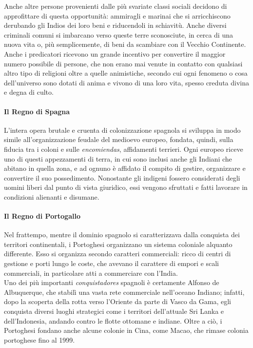 \documentclass[11pt]{report}
\begin{document}
	Anche altre persone provenienti dalle più svariate classi sociali decidono di approfittare di questa opportunità: ammiragli e marinai che si arricchiscono derubando gli Indios dei loro beni e riducendoli in schiavitù. Anche diversi criminali comuni si imbarcano verso queste terre sconosciute, in cerca di una nuova vita o, più semplicemente, di beni da scambiare con il Vecchio Continente. Anche i predicatori ricevono un grande incentivo per convertire il maggior numero possibile di persone, che non erano mai venute in contatto con qualsiasi altro tipo di religioni oltre a quelle animistiche, secondo cui ogni fenomeno o cosa dell'universo sono dotati di anima e vivono di una loro vita, spesso creduta divina e degna di culto.
	
	\paragraph*{Il Regno di Spagna}
	
	L'intera opera brutale e cruenta di colonizzazione spagnola si sviluppa in modo simile all'organizzazione feudale del medioevo europeo, fondata, quindi, sulla fiducia tra i coloni e sulle \textit{encomiendas}, affidamenti terrieri. Ogni europeo riceve uno di questi appezzamenti di terra, in cui sono inclusi anche gli Indiani che abitano in quella zona, e ad ognuno è affidato il compito di gestire, organizzare e convertire il suo possedimento. Nonostante gli indigeni fossero considerati degli uomini liberi dal punto di vista giuridico, essi vengono sfruttati e fatti lavorare in condizioni alienanti e disumane.
	
	\paragraph*{Il Regno di Portogallo}
	
	Nel frattempo, mentre il dominio spagnolo si caratterizzava dalla conquista dei territori continentali, i Portoghesi organizzano un sistema coloniale alquanto differente. Esso si organizza secondo caratteri commerciali: ricco di centri di gestione e porti lungo le coste, che avevano il carattere di empori e scali commerciali, in particolare atti a commerciare con l'India. \\
	
	Uno dei più importanti \textit{conquistadores} spagnoli è certamente Alfonso de Albuquerque, che stabilì una vasta rete commerciale nell'oceano Indiano; infatti, dopo la scoperta della rotta verso l'Oriente da parte di Vasco da Gama, egli conquista diversi luoghi strategici come i territori dell'attuale Sri Lanka e dell'Indonesia, andando contro le flotte ottomane e indiane. Oltre a ciò, i Portoghesi fondano anche alcune colonie in Cina, come Macao, che rimase colonia portoghese fino al 1999.\\
	
\end{document}
